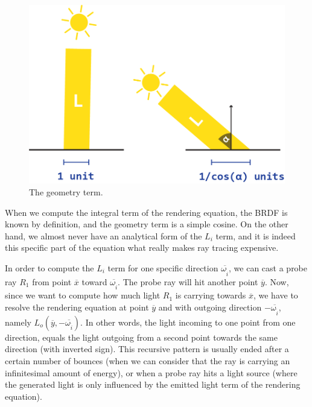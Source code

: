 \documentclass{PoliMi_MasterThesis}
\begin{document}
\begin{figure}[H]
    \centering
    \includegraphics[width=\textwidth*\real{0.7}]{Images/geometry_term.png}
    \caption{The geometry term.}
    \label{fig:geometry_term}
\end{figure}

When we compute the integral term of the rendering equation, the BRDF is known by definition, and the geometry term is a simple cosine. On the other hand, we almost never have an analytical form of the $L_i$ term, and it is indeed this specific part of the equation what really makes ray tracing expensive.

In order to compute the $L_i$ term for one specific direction $\overline{\omega_{\tilde{i}}}$, we can cast a probe ray $R_1$ from point $\overline{x}$ toward $\overline{\omega_{\tilde{i}}}$. The probe ray will hit another point $\overline{y}$. Now, since we want to compute how much light $R_1$ is carrying towards $\overline{x}$, we have to resolve the rendering equation at point $\overline{y}$ and with outgoing direction $-\overline{\omega_{\tilde{i}}}$, namely $L_o(\overline{y}, -\overline{\omega_{\tilde{i}}})$. In other words, the light incoming to one point from one direction, equals the light outgoing from a second point towards the same direction (with inverted sign). This recursive pattern is usually ended after a certain number of bounces (when we can consider that the ray is carrying an infinitesimal amount of energy), or when a probe ray hits a light source (where the generated light is only influenced by the emitted light term of the rendering equation).
\end{document}
